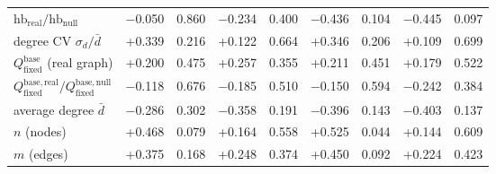 \begin{table}[t]
\begin{tabular}{lrrrrrrrr}
$\mathrm{hb}_{\mathrm{real}}/\mathrm{hb}_{\mathrm{null}}$ & $-$0.050 & 0.860 & $-$0.234 & 0.400 & $-$0.436 & 0.104 & $-$0.445 & 0.097 \\
degree CV $\sigma_d/\bar d$ & +0.339 & 0.216 & +0.122 & 0.664 & +0.346 & 0.206 & +0.109 & 0.699 \\
$Q_{\mathrm{fixed}}^{\mathrm{base}}$ (real graph) & +0.200 & 0.475 & +0.257 & 0.355 & +0.211 & 0.451 & +0.179 & 0.522 \\
$Q_{\mathrm{fixed}}^{\mathrm{base,real}}/Q_{\mathrm{fixed}}^{\mathrm{base,null}}$ & $-$0.118 & 0.676 & $-$0.185 & 0.510 & $-$0.150 & 0.594 & $-$0.242 & 0.384 \\
average degree $\bar d$ & $-$0.286 & 0.302 & $-$0.358 & 0.191 & $-$0.396 & 0.143 & $-$0.403 & 0.137 \\
$n$ (nodes) & +0.468 & 0.079 & +0.164 & 0.558 & +0.525 & 0.044 & +0.144 & 0.609 \\
$m$ (edges) & +0.375 & 0.168 & +0.248 & 0.374 & +0.450 & 0.092 & +0.224 & 0.423 \\
\bottomrule
\end{tabular}
\end{table}

